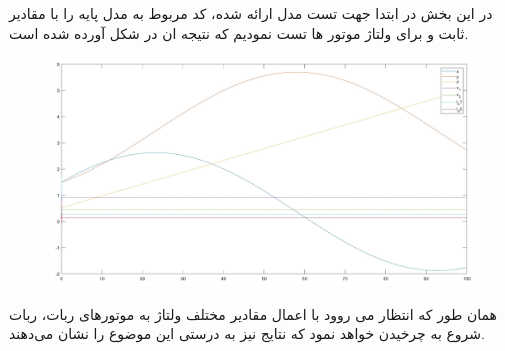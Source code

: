 در این بخش در ابتدا جهت تست مدل ارائه شده، کد مربوط به مدل پایه را با مقادیر ثابت  و  برای ولتاژ موتور ها تست نمودیم که نتیجه ان در شکل  آورده شده است.
\begin{figure}[h]
	\centering
	\includegraphics[width=15cm]{img/test1.jpg}
\end{figure}
همان طور که انتظار می روود با اعمال مقادیر مختلف ولتاژ به موتورهای ربات، ربات شروع به چرخیدن خواهد نمود که نتایج نیز به درستی این موضوع را نشان می‌دهند.

